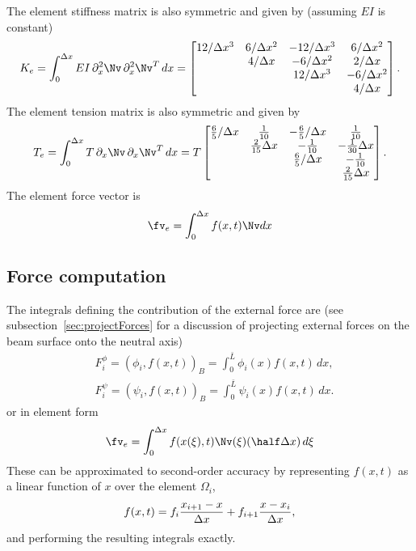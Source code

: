 \documentclass[11pt]{article}
\newcommand{\Ls}{\bar{L}}
\begin{document}
The element stiffness matrix is also symmetric and given by  (assuming $EI$ is constant)
\begin{align}
   K_e = \int_0^{\dx} EI \, \partial_x^2\Nv \, \partial_x^2\Nv^T \, dx = 
\begin{bmatrix}
12/\dx^3 & 6/\dx^2 & -12/\dx^3 & 6/\dx^2 \\
         & 4/\dx   & -6/\dx^2  & 2/\dx   \\
         &         & 12/\dx^3  &-6/\dx^2 \\
         &         &           &4/\dx
\end{bmatrix}.
\end{align} 
The element tension matrix is also symmetric and given by 
\begin{align}
   T_e = \int_0^{\dx} T \, \partial_x\Nv \, \partial_x\Nv^T \, dx = 
T 
\begin{bmatrix}
\frac{6}{5}/\dx & \frac{1}{10} & -\frac{6}{5}/\dx & \frac{1}{10} \\
         & \frac{2}{15}\dx   & -\frac{1}{10}  & -\frac{1}{30}\dx   \\
         &         & \frac{6}{5}/\dx  &-\frac{1}{10} \\
         &         &           &\frac{2}{15}\dx
\end{bmatrix}.
\end{align} 
% 
The element force vector is 
\begin{align}
 \fv_e = \int_0^{\dx} f(x,t) \Nv dx
\end{align} 

\subsection{Force computation} \label{eq:BeamModel_ForceComputation}

The integrals defining the contribution of the external force are 
(see subsection~\ref{sec:projectForces} for a discussion of projecting external forces on the beam surface onto the neutral axis)
\begin{align}
& F_i^\phi  = ( \phi_i, f(x,t) )_B  = \int_0^{\Ls} \phi_i(x) f(x,t) \, dx, \\
& F_i^\psi =  ( \psi_i, f(x,t) )_B  = \int_0^{\Ls} \psi_i(x) f(x,t) \, dx.
\end{align}
or in element form
\begin{align}
 \fv_e = \int_0^{\dx} f(x(\xi),t) \Nv(\xi) (\half \dx) \, d\xi
\end{align} 
These can be approximated to second-order accuracy by representing $f(x,t)$ as a linear
function of $x$ over the element $\Omega_i$,
\begin{align}
   f(x,t) = f_i\frac{x_{i+1}-x}{\Delta x}  + f_{i+1} \frac{x-x_i}{\Delta x} ,
\end{align}
and performing the resulting integrals exactly. 
\end{document}
